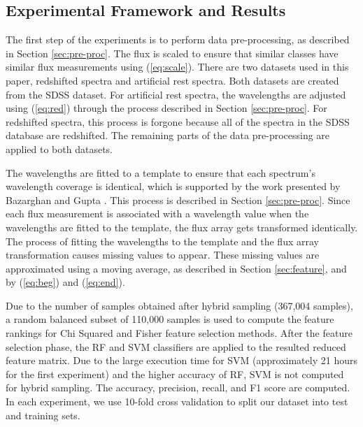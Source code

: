 \documentclass[conference]{IEEEtran}
\begin{document}
	\subsection{Experimental Framework and Results}\label{sec:results}

    	The first step of the experiments is to perform data pre-processing, as described in Section \ref{sec:pre-proc}. The flux is scaled to ensure that similar classes have similar flux measurements using (\ref{eq:scale}). There are two datasets used in this paper, redshifted spectra and artificial rest spectra. Both datasets are created from the SDSS dataset. For artificial rest spectra, the wavelengths are adjusted using (\ref{eq:red}) through the process described in Section \ref{sec:pre-proc}. For redshifted spectra, this process is forgone because all of the spectra in the SDSS database are redshifted. The remaining parts of the data pre-processing are applied to both datasets.

	The wavelengths are fitted to a template to ensure that each spectrum's wavelength coverage is identical, which is supported by the work presented by Bazarghan and Gupta \cite{Bazarghan}. This process is described in Section \ref{sec:pre-proc}. Since each flux measurement is associated with a wavelength value when the wavelengths are fitted to the template, the flux array gets transformed identically. The process of fitting the wavelengths to the template and the flux array transformation causes missing values to appear. These missing values are approximated using a moving average, as described in Section \ref{sec:feature}, and by (\ref{eq:beg}) and (\ref{eq:end}).


Due to the number of samples obtained after hybrid sampling (367,004 samples), a random balanced subset of 110,000 samples is used to compute the feature rankings for Chi Squared and Fisher feature selection methods. After the feature selection phase, the RF and SVM classifiers are applied to the resulted reduced feature matrix. Due to the large execution time for SVM (approximately 21 hours for the first experiment) and the higher accuracy of RF, SVM is not computed for hybrid sampling. The accuracy, precision, recall, and F1 score are computed. In each experiment, we use 10-fold cross validation to split our dataset into test and training sets. 
\end{document}
